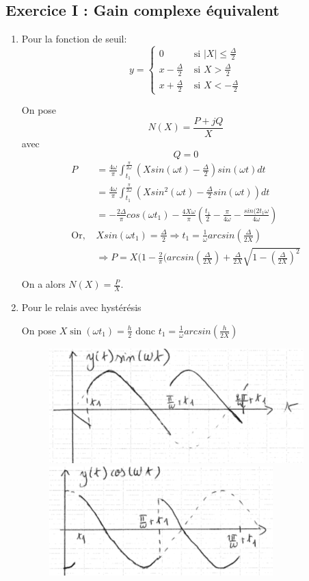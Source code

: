 \documentclass{../../td}{subfiles}
\begin{document}
\subsection*{Exercice I : Gain complexe équivalent}
\begin{enumerate}\setlength{\itemsep}{1cm}
\newcommand\conftitle{some conference}
\item Pour la fonction de seuil:
\[ y = 
\left\{
\begin{array}{cc}
0 & \text{ si } |X| \leq \frac{\Delta}{2} \\
x-\frac{\Delta}{2} & \text{ si } X > \frac{\Delta}{2} \\
x+\frac{\Delta}{2} & \text{ si } X < -\frac{\Delta}{2}
\end{array}
\right.
\]



		On pose \[ N(X) = \frac{P+jQ}{X} \] avec \[ Q=0 \]
\begin{align*}
P &= \frac{4\omega}{\pi} \int_{t_1}^{\frac{\pi}{2\omega}}(Xsin(\omega t) - \frac{\Delta}{2})sin(\omega t) dt\\
&= \frac{4\omega}{\pi} \int_{t_1}^{\frac{\pi}{2\omega}}(Xsin^2(\omega t) - \frac{\Delta}{2}sin(\omega t)) dt\\
&=-\frac{2\Delta}{\pi}cos(\omega t_1) - \frac{4 X \omega}{\pi}(\frac{t_1}{2} - \frac{\pi}{4\omega} - \frac{sin(2t_1 \omega}{4\omega})\\
\text{Or, } & Xsin(\omega t_1) = \frac{\Delta}{2} \Rightarrow t_1 = \frac{1}{\omega} arcsin(\frac{\Delta}{2X})\\
&\Rightarrow P = X (1 -  \frac{2}{\pi}(arcsin(\frac{\Delta}{2X}) + \frac{\Delta}{2X}\sqrt{1-(\frac{\Delta}{2X})^2}
\end{align*}

On a alors $N(X) = \frac{P}{X}$.


\item Pour le relais avec hystérésis

On pose $X\sin(\omega t_1) = \frac{h}{2} \text{ donc } t_1 = \frac{1}{\omega} arcsin(\frac{h}{2X})$

\begin{figure}[h!]
\centering
\includegraphics[scale=0.5]{4}
\includegraphics[scale=0.5]{5}
\end{figure}


\end{enumerate}
\end{document}
